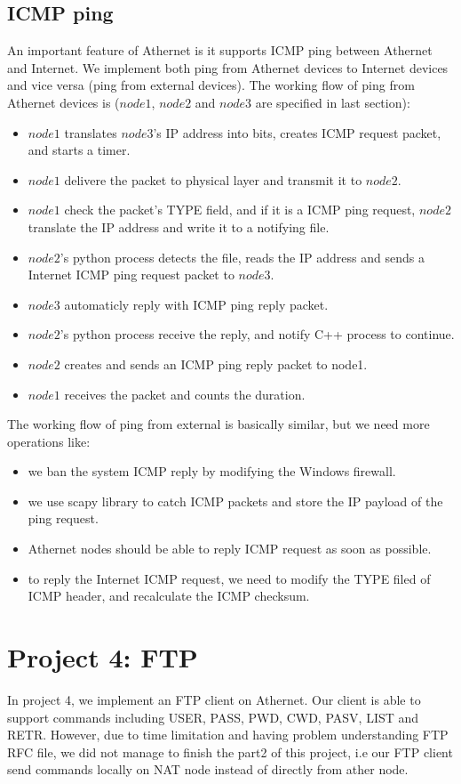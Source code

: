 \documentclass[11pt, conference]{IEEEtran}
\begin{document}
\subsection{ICMP ping}
An important feature of Athernet is it supports ICMP ping between Athernet and Internet. We implement both ping from Athernet devices to Internet devices and vice versa (ping from external devices). The working flow of
ping from Athernet devices is ($node1$, $node2$ and $node3$ are specified in last section):
\begin{itemize}
    \item $node1$ translates $node3$'s IP address into bits, creates ICMP request packet, and starts a timer.
    \item $node1$ delivere the packet to physical layer and transmit it to $node2$.
    \item $node1$ check the packet's TYPE field, and if it is a ICMP ping request, $node2$ translate the IP address and write it to a notifying file.
    \item $node2$'s python process detects the file, reads the IP address and sends a Internet ICMP ping request packet to $node3$.
    \item $node3$ automaticly reply with ICMP ping reply packet.
    \item $node2$'s python process receive the reply, and notify C++ process to continue.
    \item $node2$ creates and sends an ICMP ping reply packet to node1.
    \item $node1$ receives the packet and counts the duration.
\end{itemize}
The working flow of ping from external is basically similar, but we need more operations like:
\begin{itemize}
    \item we ban the system ICMP reply by modifying the Windows firewall.
    \item we use scapy library to catch ICMP packets and store the IP payload of the ping request.
    \item Athernet nodes should be able to reply ICMP request as soon as possible.
    \item to reply the Internet ICMP request, we need to modify the TYPE filed of ICMP header, and recalculate the ICMP checksum.
\end{itemize}


\section{{Project 4: FTP}}
    In project 4, we implement an FTP client on Athernet.
    Our client is able to support commands including USER, PASS,
    PWD, CWD, PASV, LIST and RETR. However, due to time limitation and having
    problem understanding FTP RFC file, we did not manage to finish the part2 of this project, i.e
    our FTP client send commands locally on NAT node instead of directly from ather node.
\end{document}
